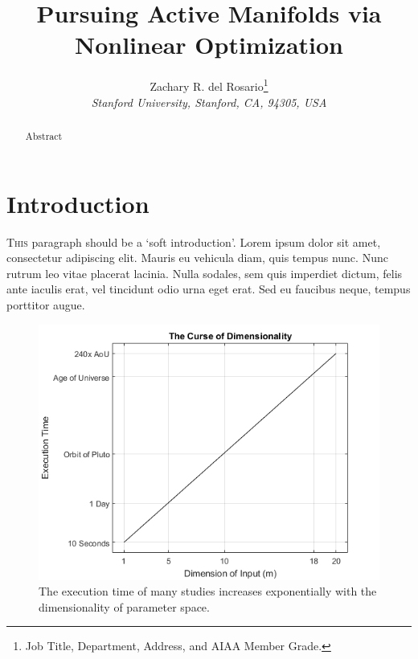 \documentclass[]{aiaa-tc}%
\title{Pursuing Active Manifolds via Nonlinear Optimization}
\author{
  Zachary R. del Rosario\thanks{Job Title, Department, Address, and AIAA Member Grade.}\\
  {\normalsize\itshape
   Stanford University, Stanford, CA, 94305, USA}\\
 }
\begin{document}
\maketitle

\begin{abstract}
Abstract
\end{abstract}

\printnomenclature %

\section{Introduction}

\lettrine[nindent=0pt]{T}{his} paragraph should be a `soft introduction'. Lorem ipsum dolor sit amet, consectetur adipiscing elit. Mauris eu vehicula diam, quis tempus nunc. Nunc rutrum leo vitae placerat lacinia. Nulla sodales, sem quis imperdiet dictum, felis ante iaculis erat, vel tincidunt odio urna eget erat. Sed eu faucibus neque, tempus porttitor augue.

\begin{figure}
 \includegraphics{../images/curse_of_dimensionality}
 \caption{The execution time of many studies increases exponentially with the dimensionality of parameter space.}
 \label{fig:dimensionality}
\end{figure}
\end{document}
